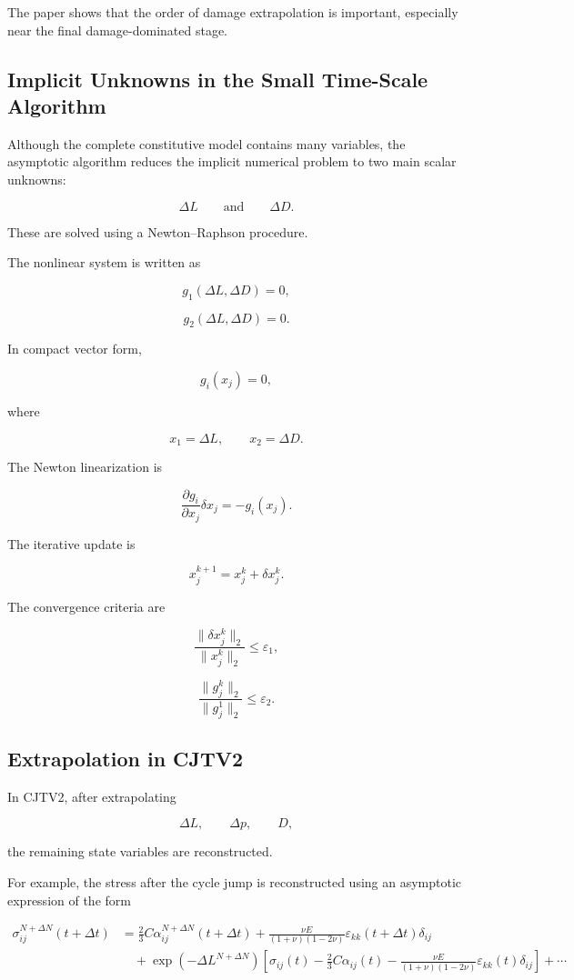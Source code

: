 ﻿\documentclass[11pt,a4paper]{article}
\begin{document}
The paper shows that the order of damage extrapolation is important, especially near the final damage-dominated stage.

\subsection{Implicit Unknowns in the Small Time-Scale Algorithm}

Although the complete constitutive model contains many variables, the asymptotic algorithm reduces the implicit numerical problem to two main scalar unknowns:

\[
\Delta L
\qquad \text{and} \qquad
\Delta D.
\]

These are solved using a Newton--Raphson procedure.

The nonlinear system is written as

\[
g_1(\Delta L,\Delta D)=0,
\]

\[
g_2(\Delta L,\Delta D)=0.
\]

In compact vector form,

\[
g_i(x_j)=0,
\]

where

\[
x_1=\Delta L,
\qquad
x_2=\Delta D.
\]

The Newton linearization is

\[
\frac{\partial g_i}{\partial x_j}
\delta x_j
=
-g_i(x_j).
\]

The iterative update is

\[
x_j^{k+1}
=
x_j^k
+
\delta x_j^k.
\]

The convergence criteria are

\[
\frac{\|\delta x_j^k\|_2}{\|x_j^k\|_2}
\leq
\varepsilon_1,
\]

\[
\frac{\|g_j^k\|_2}{\|g_j^1\|_2}
\leq
\varepsilon_2.
\]

\subsection{Extrapolation in CJTV2}

In CJTV2, after extrapolating

\[
\Delta L,
\qquad
\Delta p,
\qquad
D,
\]

the remaining state variables are reconstructed.

For example, the stress after the cycle jump is reconstructed using an asymptotic expression of the form

\[
\begin{aligned}
\sigma^{N+\Delta N}_{ij}(t+\Delta t)
&=
\frac{2}{3} C\alpha^{N+\Delta N}_{ij}(t+\Delta t)
+
\frac{\nu E}{(1+\nu)(1-2\nu)}\varepsilon_{kk}(t+\Delta t)\delta_{ij} \\
&\quad
+
\exp(-\Delta L^{N+\Delta N})
\left[
\sigma_{ij}(t)
-
\frac{2}{3}C\alpha_{ij}(t)
-
\frac{\nu E}{(1+\nu)(1-2\nu)}\varepsilon_{kk}(t)\delta_{ij}
\right]
+
\cdots
\end{aligned}
\]
\end{document}
